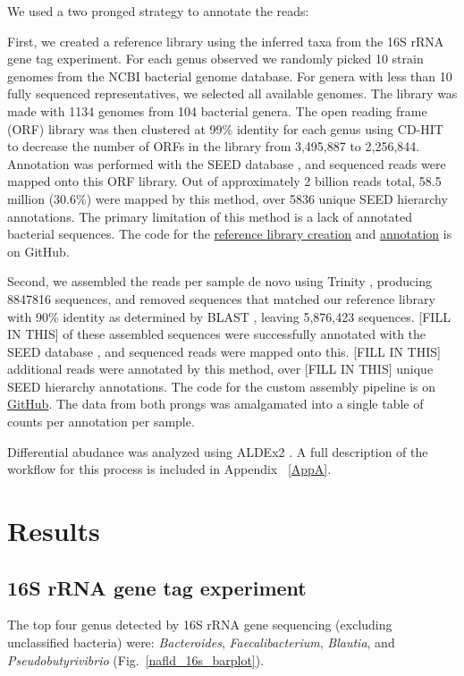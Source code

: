 We used a two pronged strategy to annotate the reads:

First, we created a reference library using the inferred taxa from the 16S rRNA gene tag experiment. For each genus observed we randomly picked 10 strain genomes from the NCBI bacterial genome database. For genera with less than 10 fully sequenced representatives, we selected all available genomes. The library was made with 1134 genomes from 104 bacterial genera. The open reading frame (ORF) library was then clustered at 99\% identity for each genus using CD-HIT \cite{li2006cd} to decrease the number of ORFs in the library from 3,495,887 to 2,256,844. Annotation was performed with the SEED database \cite{overbeek2005subsystems}, and sequenced reads were mapped onto this ORF library. Out of approximately 2 billion reads total, 58.5 million (30.6\%) were mapped by this method, over 5836 unique SEED hierarchy annotations. The primary limitation of this method is a lack of annotated bacterial sequences. The code for the \href{https://github.com/ruthgrace/make_functional_mapping_library}{reference library creation} and \href{https://github.com/ruthgrace/mapping_library_annotated_counts}{annotation} is on GitHub.

Second, we assembled the reads per sample de novo using Trinity \cite{haas2013novo}, producing 8847816 sequences, and removed sequences that matched our reference library with 90\% identity as determined by BLAST \cite{altschul1990basic}, leaving 5,876,423 sequences. [FILL IN THIS] of these assembled sequences were successfully annotated with the SEED database \cite{overbeek2005subsystems}, and sequenced reads were mapped onto this. [FILL IN THIS] additional reads were annotated by this method, over [FILL IN THIS] unique SEED hierarchy annotations. The code for the custom assembly pipeline is on \href{https://github.com/ruthgrace/exploring_nafld_assembly}{GitHub}. The data from both prongs was amalgamated into a single table of counts per annotation per sample.

Differential abudance was analyzed using ALDEx2 \cite{fernandes2014unifying}. A full description of the workflow for this process is included in Appendix ~\ref{AppA}.

\FloatBarrier

\section{Results}

\subsection{16S rRNA gene tag experiment}
The top four genus detected by 16S rRNA gene sequencing (excluding unclassified bacteria) were: \textit{Bacteroides}, \textit{Faecalibacterium}, \textit{Blautia}, and \textit{Pseudobutyrivibrio} (Fig.~\ref{nafld_16s_barplot}).

